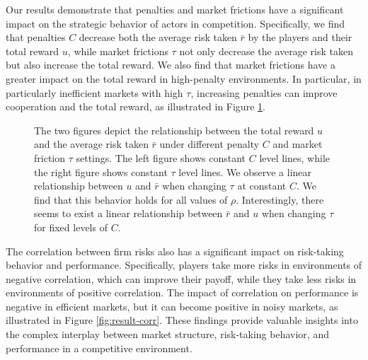 \documentclass[preprint,12pt,authoryear]{elsarticle}
\theoremstyle{definition}
\begin{document}
Our results demonstrate that penalties and market frictions have a significant impact on the strategic behavior of actors in competition. Specifically, we find that penalties $C$ decrease both the average risk taken $\bar r$ by the players and their total reward $u$, while market frictions $\tau$ not only decrease the average risk taken but also increase the total reward. We also find that market frictions have a greater impact on the total reward in high-penalty environments. In particular, in particularly inefficient markets with high $\tau$, increasing penalties can improve cooperation and the total reward, as illustrated in Figure \ref{fig:result-noise}.

\begin{figure}[htbp]
  \centering
  \begin{minipage}[t]{0.48\textwidth}
    \centering
    
  \end{minipage}
  \hfill
  \begin{minipage}[t]{0.48\textwidth}
    \centering
    
  \end{minipage}
  \caption{
  The two figures depict the relationship between the total reward $u$ and the average risk taken $\bar r$ under different penalty $C$ and market friction $\tau$ settings. The left figure shows constant $C$ level lines, while the right figure shows constant $\tau$ level lines. We observe a linear relationship between $u$ and $\bar r$ when changing $\tau$ at constant $C$. We find that this behavior holds for all values of $\rho$. Interestingly, there seems to exist a linear relationship between $\bar r$ and $u$ when changing $\tau$ for fixed levels of $C$.}
  \label{fig:result-noise}  
\end{figure}

 The correlation between firm risks also has a significant impact on risk-taking behavior and performance. Specifically, players take more risks in environments of negative correlation, which can improve their payoff, while they take less risks in environments of positive correlation. The impact of correlation on performance is negative in efficient markets, but it can become positive in noisy markets, as illustrated in Figure \ref{fig:result-corr}. These findings provide valuable insights into the complex interplay between market structure, risk-taking behavior, and performance in a competitive environment.
\end{document}
